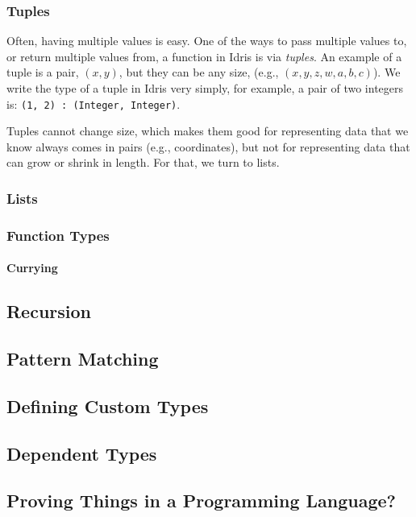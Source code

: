 \documentclass{article}
\newcommand{\inline}[1]{\texttt{#1}}
\begin{document}
\subsubsection{Tuples}
Often, having multiple values is easy.
One of the ways to pass multiple values to, or return multiple values from, a function in Idris is via \textit{tuples}.
An example of a tuple is a pair, $(x, y)$, but they can be any size, (e.g., $(x, y, z, w, a, b, c)$).
We write the type of a tuple in Idris very simply, for example, a pair of two integers is: \inline{(1, 2) : (Integer, Integer)}.

Tuples cannot change size, which makes them good for representing data that we know always comes in pairs (e.g., coordinates), but not for representing data that can grow or shrink in length.
For that, we turn to lists.

\subsubsection{Lists}

\subsubsection{Function Types}
\paragraph{Currying}

\subsection{Recursion}

\subsection{Pattern Matching}

\subsection{Defining Custom Types}

\subsection{Dependent Types}

\subsection{Proving Things in a Programming Language?}
\end{document}
